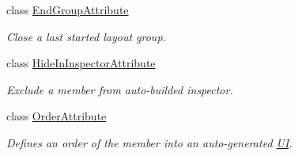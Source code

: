 \begin{DoxyCompactItemize}
class \mbox{\hyperlink{class_wpf_handler_1_1_u_i_1_1_auto_layout_1_1_configuration_1_1_end_group_attribute}{End\+Group\+Attribute}}
\begin{DoxyCompactList}\small\item\em Close a last started layout group. \end{DoxyCompactList}\item 
class \mbox{\hyperlink{class_wpf_handler_1_1_u_i_1_1_auto_layout_1_1_configuration_1_1_hide_in_inspector_attribute}{Hide\+In\+Inspector\+Attribute}}
\begin{DoxyCompactList}\small\item\em Exclude a member from auto-\/builded inspector. \end{DoxyCompactList}\item 
class \mbox{\hyperlink{class_wpf_handler_1_1_u_i_1_1_auto_layout_1_1_configuration_1_1_order_attribute}{Order\+Attribute}}
\begin{DoxyCompactList}\small\item\em Defines an order of the member into an auto-\/generated \mbox{\hyperlink{namespace_wpf_handler_1_1_u_i}{UI}}. \end{DoxyCompactList}\end{DoxyCompactItemize}

